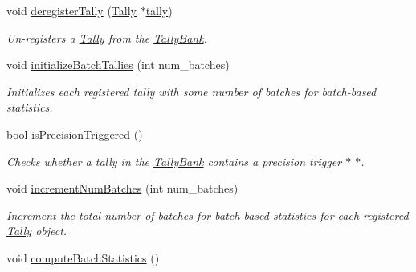 \begin{DoxyCompactItemize}
void \hyperlink{classTallyBank_aff3fd46f3afb08f88f6baf1dec94da51}{deregister\-Tally} (\hyperlink{classTally}{Tally} $\ast$\hyperlink{classTallyBank_a929908afec2f18a4321b29beb52877f2}{tally})
\begin{DoxyCompactList}\small\item\em Un-\/registers a \hyperlink{classTally}{Tally} from the \hyperlink{classTallyBank}{Tally\-Bank}. \end{DoxyCompactList}\item 
void \hyperlink{classTallyBank_af968ec74da43d04da68c39cb6d69c5ca}{initialize\-Batch\-Tallies} (int num\-\_\-batches)
\begin{DoxyCompactList}\small\item\em Initializes each registered tally with some number of batches for batch-\/based statistics. \end{DoxyCompactList}\item 
bool \hyperlink{classTallyBank_adea9d4feafcbed060abc21d24d81c990}{is\-Precision\-Triggered} ()
\begin{DoxyCompactList}\small\item\em Checks whether a tally in the \hyperlink{classTallyBank}{Tally\-Bank} contains a precision trigger $\ast$ $\ast$. \end{DoxyCompactList}\item 
void \hyperlink{classTallyBank_af9e829d18a91b2ffa3196bad35db4d73}{increment\-Num\-Batches} (int num\-\_\-batches)
\begin{DoxyCompactList}\small\item\em Increment the total number of batches for batch-\/based statistics for each registered \hyperlink{classTally}{Tally} object. \end{DoxyCompactList}\item 
\hypertarget{classTallyBank_af3de613ba9ec0fd23c4c459b6fdda7f4}{void \hyperlink{classTallyBank_af3de613ba9ec0fd23c4c459b6fdda7f4}{compute\-Batch\-Statistics} ()}\label{classTallyBank_af3de613ba9ec0fd23c4c459b6fdda7f4}


\end{DoxyCompactItemize}
